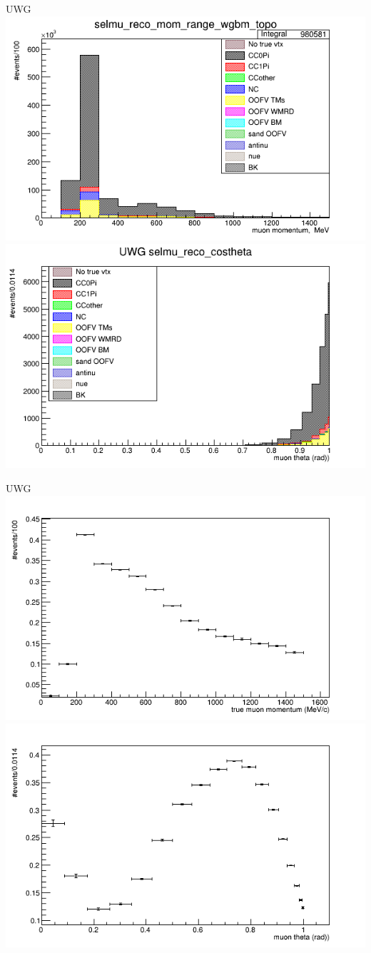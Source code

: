 \documentclass{beamer}
\begin{document}
\begin{frame}{UWG}
\center
\includegraphics[width=.45\textwidth]{images/selmu_reco_mom_range_UWG_wgbm_topo_accum_level[][16]_data_mc.png}
\includegraphics[width=.45\textwidth]{images/selmu_reco_costheta_wgbm_topo_UWG_accum_level[][16]_data_mc.png}
\end{frame}
\begin{frame}{UWG}
\center
\includegraphics[width=.45\textwidth]{images/Eff_selmu_true_mom_wgbm_topo_UWG_accum_level[][16]_data_mc.png}
\includegraphics[width=.45\textwidth]{images/Eff_selmu_true_costheta_wgbm_topo_UWG_accum_level[][16]_data_mc.png}
\end{frame}
\end{document}
